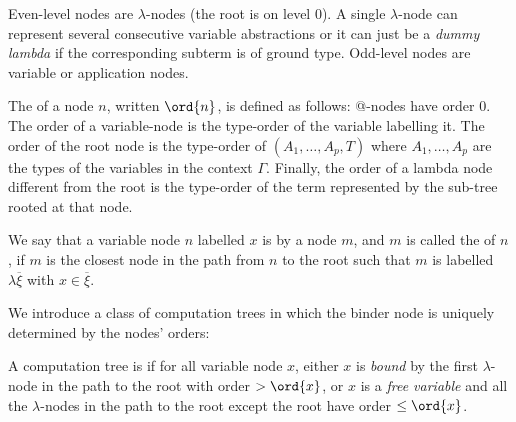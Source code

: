 Even-level nodes are $\lambda$-nodes (the root is on level 0). A
single $\lambda$-node can represent several consecutive variable
abstractions or it can just be a \emph{dummy lambda} if the
corresponding subterm is of ground type.  Odd-level nodes are
variable or application nodes.

The  of a node $n$, written $\ord{n}$, is defined as
follows: @-nodes have order $0$. The order of a variable-node is the
type-order of the variable labelling it. The order of the root node
is the type-order of $(A_1,\ldots,A_p, T)$ where $A_1,\ldots, A_p$
are the types of the variables in the context $\Gamma$. Finally, the
order of a lambda node different from the root is the type-order of
the term represented by the sub-tree rooted at that node.

We say that a variable node $n$ labelled $x$ is  by a
node $m$, and $m$ is called the  of $n$, if $m$ is
the closest node in the path from $n$ to the root such that $m$ is
labelled $\lambda \overline{\xi}$ with $x\in \overline{\xi}$.


We introduce a class of computation trees in which the binder node
is uniquely determined by the nodes' orders:
\begin{definition}\rm
  A computation tree is  if for all
  variable node $x$, either $x$ is \emph{bound} by the first
  $\lambda$-node in the path to the root with order $> \ord{x}$, or $x$
  is a \emph{free variable} and all the $\lambda$-nodes in the path to
  the root except the root have order $\leq \ord{x}$.
\end{definition}

